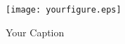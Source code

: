 
\begin{center}
\begin{figure}[H] 
\caption{Your Caption}
\label{figure:youlabel}
\centering
\texttt{[image: yourfigure.eps]}
\end{figure}
\end{center}
